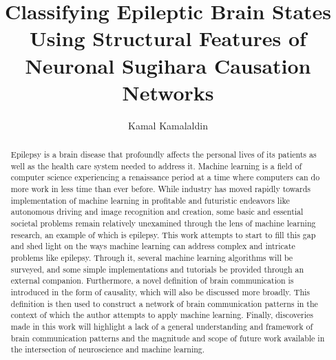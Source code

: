\documentclass[journal,12pt,onecolumn,draftclsnofoot]{IEEEtran}  %
\title{Classifying Epileptic Brain States Using Structural Features of Neuronal Sugihara Causation Networks}
\author{Kamal Kamalaldin}
\begin{document}
\maketitle

\thispagestyle{empty}
\cleardoublepage

\tableofcontents

\thispagestyle{empty}
\cleardoublepage


\begin{abstract}
Epilepsy is a brain disease that profoundly affects the personal lives of its patients as well as the health care system needed to address it. Machine learning is a field of computer science experiencing a renaissance period at a time where computers can do more work in less time than ever before. While industry has moved rapidly towards  implementation of machine learning in profitable and futuristic endeavors like autonomous driving and image recognition and creation, some basic and essential societal problems remain relatively unexamined through the lens of machine learning research, an example of which is epilepsy. This work attempts to start to fill this gap and shed light on the ways machine learning can address complex and intricate problems like epilepsy. Through it, several machine learning algorithms will be surveyed, and some simple implementations and tutorials be provided through an external companion. Furthermore, a novel definition of brain communication is introduced in the form of causality, which will also be discussed more broadly. This definition is then used to construct a network of brain communication patterns in the context of which the author attempts to apply machine learning. Finally, discoveries made in this work will highlight a lack of a general understanding and framework of brain communication patterns and the magnitude and scope of future work available in the intersection of neuroscience and machine learning.
\end{abstract}

% 

\clearpage

\clearpage



% 


\end{document}
